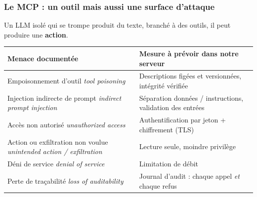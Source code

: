 \documentclass[aspectratio=169,11pt]{beamer}
\begin{document}
\begin{frame}
  \frametitle{Le MCP : un outil mais aussi une surface d'attaque}
  \vspace{0.1cm}
  \begin{block}{}
    \small Un LLM isol\'e qui se trompe produit du texte, branch\'e
    \`a des outils, il peut produire une \textbf{action}.
  \end{block}
  \vspace{0.2cm}
  \begin{center}
  {\footnotesize
  \renewcommand{\arraystretch}{1.15}
  \begin{tabular}{@{}p{}p{}@{}}
    {\color{colAccent}\bfseries Menace document\'ee} &
    {\color{colTitre}\bfseries Mesure \`a pr\'evoir dans notre serveur} \\[1pt]
    \hline
    Empoisonnement d'outil\newline
      {\scriptsize\itshape\color{colGris}tool poisoning} &
      Descriptions fig\'ees et versionn\'ees, int\'egrit\'e v\'erifi\'ee \\
    Injection indirecte de prompt\newline
      {\scriptsize\itshape\color{colGris}indirect prompt injection} &
      S\'eparation donn\'ees / instructions, validation des entr\'ees \\
    Acc\`es non autoris\'e\newline
      {\scriptsize\itshape\color{colGris}unauthorized access} &
      Authentification par jeton + chiffrement (TLS) \\
    Action ou exfiltration non voulue\newline
      {\scriptsize\itshape\color{colGris}unintended action / exfiltration} &
      Lecture seule, moindre privil\`ege \\
    D\'eni de service\newline
      {\scriptsize\itshape\color{colGris}denial of service} &
      Limitation de d\'ebit \\
    Perte de tra\c{c}abilit\'e\newline
      {\scriptsize\itshape\color{colGris}loss of auditability} &
      Journal d'audit : chaque appel \emph{et} chaque refus \\
  \end{tabular}}
  \end{center}

\end{frame}
\end{document}
